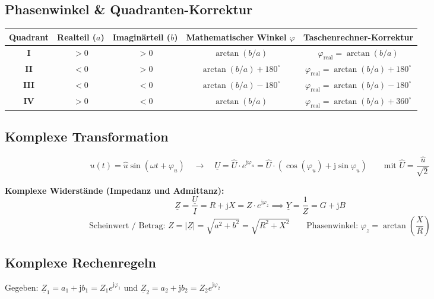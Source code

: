 \documentclass[a4paper,11pt]{article}
\begin{document}
\subsection*{Phasenwinkel \& Quadranten-Korrektur}
\begin{center}
\small
\begin{tabular}{ccccc}
\toprule
\textbf{Quadrant} & \textbf{Realteil ($a$)} & \textbf{Imaginärteil ($b$)} & \textbf{Mathematischer Winkel $\varphi$} & \textbf{Taschenrechner-Korrektur} \\
\midrule
\textbf{I} & $> 0$ & $> 0$ & $\arctan(b/a)$ & $\varphi_{\text{real}} = \arctan(b/a)$ \\ \addlinespace
\textbf{II} & $< 0$ & $> 0$ & $\arctan(b/a) + 180^\circ$ & $\varphi_{\text{real}} = \arctan(b/a) + 180^\circ$ \\ \addlinespace
\textbf{III} & $< 0$ & $< 0$ & $\arctan(b/a) - 180^\circ$ & $\varphi_{\text{real}} = \arctan(b/a) - 180^\circ$ \\ \addlinespace
\textbf{IV} & $> 0$ & $< 0$ & $\arctan(b/a)$ & $\varphi_{\text{real}} = \arctan(b/a) + 360^\circ$ \\ \bottomrule
\end{tabular}
\end{center}

\subsection*{Komplexe Transformation}
\[ u(t) = \hat{u}\sin(\omega t + \varphi_u) \quad \rightarrow \quad \underline{U} = \hat{U} \cdot e^{\mathrm{j}\varphi_u} = \hat{U} \cdot (\cos(\varphi_u) + \mathrm{j}\sin\varphi_u) \qquad \text{mit } \hat{U} = \frac{\hat{u}}{\sqrt{2}} \]

\textbf{Komplexe Widerstände (Impedanz und Admittanz):}
\[ \underline{Z} = \frac{\underline{U}}{\underline{I}} = R + \mathrm{j}X = Z \cdot e^{\mathrm{j}\varphi_z} \implies \underline{Y} = \frac{1}{\underline{Z}} = G + \mathrm{j}B \]
\[ \text{Scheinwert / Betrag: } Z = |\underline{Z}| = \sqrt{a^2 + b^2} = \sqrt{R^2 + X^2} \qquad \text{Phasenwinkel: } \varphi_z = \arctan\left(\frac{X}{R}\right) \]

\subsection*{Komplexe Rechenregeln}
Gegeben: $\underline{Z}_1 = a_1 + \mathrm{j}b_1 = Z_1 e^{\mathrm{j}\varphi_1}$ \quad und \quad $\underline{Z}_2 = a_2 + \mathrm{j}b_2 = Z_2 e^{\mathrm{j}\varphi_2}$
\end{document}
